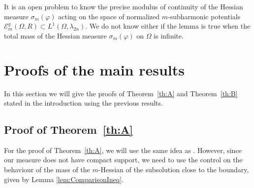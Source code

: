 It is an open problem to know the precise modulus of continuity of the Hessian measure $\sigma_m (\varphi)$ acting on the space of normalized $m$-subharmonic potentials $\mathcal{E}^g_m(\Omega,R) \subset L^1 (\Omega,\lambda_{2 n})$. We do not know either if the lemma is true when the total mass of the Hessian measure $\sigma_m (\varphi) $ on $\Omega$ is infinite.

\section{Proofs of the main results}\label{sec:5}

In this section we will give the proofs of Theorem~\ref{th:A} and Theorem~\ref{th:B} stated in the introduction using the previous results.

\subsection{ Proof of Theorem~\ref{th:A}}

For the proof of Theorem~\ref{th:A}, we will use the same idea as \cite{KN19}. However, since our measure does not have compact support, we need to use the control on the behaviour of the mass of the $m$-Hessian of the subsolution close to the boundary, given by Lemma \ref{lem:ComparisonIneq}.


